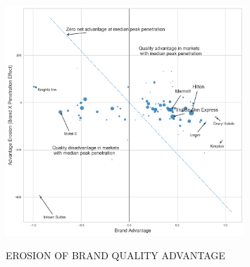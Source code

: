 \documentclass[mksc,blindrev]{informs3} %
\begin{document}

\begin{figure}[hp]
 \caption{EROSION OF BRAND QUALITY ADVANTAGE}
 \centering
  {\includegraphics[width=0.8\textwidth,height=\textheight,keepaspectratio]{./Figures/brand_coeff.png} \label{fig:brandvspenetrate}}
\end{figure}
\clearpage



\ACKNOWLEDGMENT{%
}%


%
%
%
\end{document}
